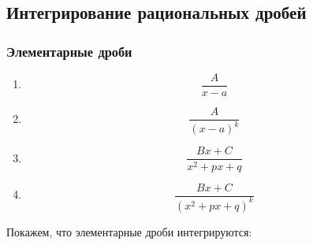 \documentclass[12pt]{article}
\begin{document}
    \subsection{Интегрирование рациональных дробей}
    \subsubsection*{Элементарные дроби}
    \begin{enumerate}
        \item \[\frac{A}{x-a}\]
        \item \[\frac{A}{(x-a)^k}\]
        \item \[\frac{Bx+C}{x^2+px+q}\]
        \item \[\frac{Bx+C}{(x^2+px+q)^k}\]
    \end{enumerate}
    Покажем, что элементарные дроби интегрируются:
\end{document}
